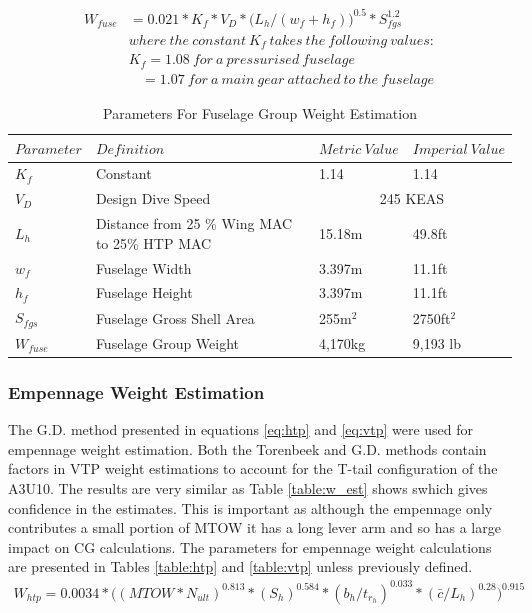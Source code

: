 \documentclass[11pt]{article}
\newcommand{\ra}[1]{\renewcommand{\arraystretch}{#1}}
\begin{document}
\begin{equation} \label{eq:fuse} %
\begin{split} 
W_{fuse}& = 0.021*K_{f}*V_{D} * \big( L_{h} / (w_{f} + h_{f}) \big) ^{0.5}*S_{fgs}^{1.2} \\
&where \ the \ constant \ K_{f} \ takes \ the \ following \ values:  \\
&K_{f} = 1.08 \ for \  a \ pressurised \ fuselage \\
&\ \ \ \ = 1.07 \ for \ a \ main \ gear \ attached \ to \ the \ fuselage
\end{split}
\end{equation}


\begin{table}[!h]
\centering %
\ra{1.3}
\begin{tabular}{@{}llll@{}}\toprule
$Parameter$ & $Definition$ & $Metric \ Value$ & $Imperial \ Value$ \\
\midrule
$K_f$& Constant & 1.14 & 1.14 \\
$V_D$ & Design Dive Speed & \multicolumn{2}{c}{245 KEAS} \\ 
$L_{h}$ & Distance from 25 \% Wing MAC to 25\% HTP MAC & 15.18m & 49.8ft \\
$w_{f}$ & Fuselage Width & 3.397m & 11.1ft \\
$h_{f}$ & Fuselage Height & 3.397m& 11.1ft \\
$S_{fgs}$ & Fuselage Gross Shell Area  & 255m$^{2}$ & 2750ft$^{2}$ \\
\midrule
$W_{fuse}$ & Fuselage Group Weight & 4,170kg & 9,193 lb \\
\bottomrule
\end{tabular}
\caption{Parameters For Fuselage Group Weight Estimation}
\label{table:fuse}
\end{table}
\FloatBarrier

\subsubsection{Empennage Weight Estimation}

The G.D. method presented in equations \ref{eq:htp} and \ref{eq:vtp} were used for empennage weight estimation. Both the Torenbeek and G.D. methods contain factors in VTP weight estimations to account for the T-tail configuration of the A3U10. The results are very similar as Table \ref{table:w_est} shows swhich gives confidence in the estimates. This is important as although the empennage only contributes a small portion of MTOW it has a long lever arm and so has a large impact on CG calculations. The parameters for empennage weight calculations are presented in Tables \ref{table:htp} and \ref{table:vtp} unless previously defined.
\FloatBarrier
\begin{equation} \label{eq:htp} %
\begin{split} 
W_{htp} =  0.0034* \Big( ( MTOW*N_{ult})^{0.813} * (S_{h})^{0.584} * ( b_{h} / t_{r_{h}})^ {0.033}* (\bar{c} / L_{h})^{0.28} \Big) ^{0.915}
\end{split}
\end{equation}
\end{document}

